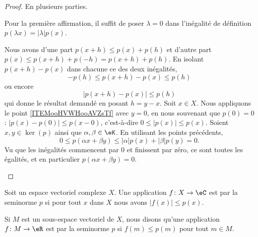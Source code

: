 \begin{proof}
	En plusieurs parties.
	\begin{subproof}
		Pour la première affirmation, il suffit de poser \( \lambda=0\) dans l'inégalité de définition \( p(\lambda x)=| \lambda |p(x)\).

		Nous avons d'une part \( p(x+h)\leq p(x)+p(h)\) et d'autre part \( p(x)\leq p(x+h)+p(-h)=p(x+h)+p(h)\). En isolant \( p(x+h)-p(x)\) dans chacune ce des deux inégalités,
		\begin{equation}
			-p(h)\leq p(x+h)-p(x)\leq p(h)
		\end{equation}
		ou encore
		\begin{equation}
			|p(x+h)-p(x)|\leq p(h)
		\end{equation}
		qui donne le résultat demandé en posant \( h=y-x\).
		Soit \( x\in X\). Nous appliquons le point \ref{ITEMooHVWHooAVZsTf} avec \( y=0\), en nous souvenant que \( p(0)=0\) : \( | p(x)-p(0) |\leq p(x-0)\), c'est-à-dire \( 0\leq | p(x) |\leq p(x)\).
		Soient \( x,y\in \ker(p)\) ainsi que \( \alpha,\beta\in \eK\). En utilisant les points précédents,
		\begin{equation}
			0\leq p(\alpha x+\beta y)\leq | \alpha |p(x)+| \beta |p(y)=0.
		\end{equation}
		Vu que les inégalités commencent par \( 0\) et finissent par zéro, ce sont toutes les égalités, et en particulier \( p(\alpha x+\beta y)=0\).
	\end{subproof}
\end{proof}

\begin{definition}		\label{DEFooNFOAooRAUuOk}
	Soit un espace vectoriel complexe \( X\). Une application \(f \colon X\to \eC  \) est  par la seminorme \( p\) si pour tout \( x\) dans \( X\) nous avons \( | f(x) |\leq p(x)\).

	Si \( M\) est un sous-espace vectoriel de \( X\), nous disons qu'une application \(f \colon M\to \eR  \) est  par la seminorme \( p\) si \( f(m)\leq p(m)\) pour tout \( m\in M\).
\end{definition}

